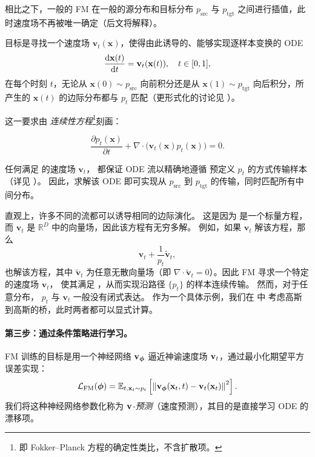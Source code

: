 相比之下，一般的 FM 在一般的源分布和目标分布 $p_{\text{src}}$ 与 $p_{\text{tgt}}$ 之间进行插值，此时速度场不再被唯一确定（后文将解释）。

目标是寻找一个速度场 $\mathbf{v}_t(\mathbf{x})$，使得由此诱导的、能够实现逐样本变换的 ODE
\[
\frac{\mathop{}\!\mathrm{d} \mathbf{x}(t)}{\mathop{}\!\mathrm{d} t} = \mathbf{v}_t(\mathbf{x}(t)), \quad t \in [0,1],
\]
在每个时刻 $t$，无论从 $\mathbf{x}(0) \sim p_{\text{src}}$ 向前积分还是从 $\mathbf{x}(1) \sim p_{\text{tgt}}$ 向后积分，所产生的 $\mathbf{x}(t)$ 的边际分布都与 $ p_t$ 匹配（更形式化的讨论见 ）。

这一要求由 \emph{连续性方程}\footnote{即 Fokker–Planck 方程的确定性类比，不含扩散项。}刻画：
\begin{mdframed}
\begin{equation}\label{eq:continuity_eq}
    \frac{\partial p_t(\mathbf{x})}{\partial t} + \nabla \cdot \big( \mathbf{v}_t(\mathbf{x}) p_t(\mathbf{x}) \big) = 0.
\end{equation}
\end{mdframed}

任何满足  的速度场 $\mathbf{v}_t$，
都保证 ODE 流以精确地遵循
预定义 $p_t$ 的方式传输样本（详见 ）。
因此，求解该 ODE 即可实现从 $p_{\text{src}}$ 到
$p_{\text{tgt}}$ 的传输，同时匹配所有中间分布。

直观上，许多不同的流都可以诱导相同的边际演化。
这是因为  是一个标量方程，而
$\mathbf{v}_t$ 是 $\mathbb{R}^D$ 中的向量场，因此该方程有无穷多解。
例如，如果 $\mathbf{v}_t$ 解该方程，那么
\[
\mathbf{v}_t + \frac{1}{p_t} \tilde{\mathbf{v}}_t,
\]
也解该方程，其中 $\tilde{\mathbf{v}}_t$ 为任意无散向量场（即
$\nabla \cdot \tilde{\mathbf{v}}_t = 0$）。因此 FM 寻求一个特定的速度场 $\mathbf{v}_t$，
使其满足 ，从而实现沿路径 $\{p_t\}$ 的样本连续传输。
然而，对于任意分布，
$p_t$ 与 $\mathbf{v}_t$ 一般没有闭式表达。
作为一个具体示例，我们在  中
考虑高斯到高斯的桥，此时两者都可以显式计算。





\paragraph{第三步：通过条件策略进行学习。}
FM 训练的目标是用一个神经网络 ${\mathbf{v}}_{\bm{\phi}}$ 逼近神谕速度场 ${\mathbf{v}}_t$，通过最小化期望平方误差实现：
\[
\mathcal{L}_{\mathrm{FM}}(\bm{\phi}) = \mathbb{E}_{t, {\mathbf{x}}_t \sim p_t} \left[ \left\| {\mathbf{v}}_{\bm{\phi}}({\mathbf{x}}_t, t) - {\mathbf{v}}_t({\mathbf{x}}_t) \right\|^2 \right].
\]
我们将这种神经网络参数化称为 \emph{${\mathbf{v}}$-预测}（速度预测），其目的是直接学习 ODE 的漂移项。

